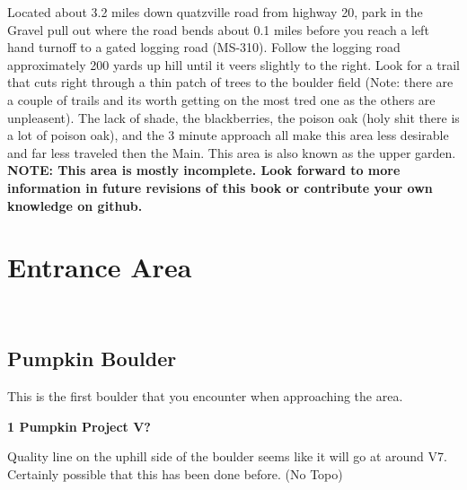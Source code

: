 \raggedcolumns
\begin{multicols}{2}
\begin{minipage}{\columnwidth}
Located about 3.2 miles down quatzville road from highway 20, park in the Gravel pull out where the road bends about 0.1 miles before you reach a left hand turnoff to a gated logging road (MS-310). Follow the logging road approximately 200 yards up hill until it veers slightly to the right. Look for a trail that cuts right through a thin patch of trees to the boulder field (Note: there are a couple of trails and its worth getting on the most tred one as the others are unpleasent). The lack of shade, the blackberries, the poison oak (holy shit there is a lot of poison oak), and the 3 minute approach all make this area less desirable and far less traveled then the Main. This area is also known as the upper garden.
\newline
\textbf{NOTE: This area is mostly incomplete. Look forward to more information in future revisions of this book or contribute your own knowledge on github.}
\end{minipage}

\newpage
		\section{Entrance Area}\label{sa:Entrance Area}
	\begin{minipage}{\columnwidth}
	\
	\end{minipage}
	
			\begin{minipage}{\columnwidth}
			\subsection*{Pumpkin Boulder}\label{bf:Pumpkin Boulder}
			This is the first boulder that you encounter when approaching the area.
			
			\end{minipage}
			
					\begin{minipage}{\linewidth}	
					\label{rt:Pumpkin Project}
\colorbox{black!20}{
\parbox{0.95\textwidth}{
\textbf{
1 Pumpkin Project V?  
}
}
}

					\begin{adjustwidth}{0.5cm}{}				
					Quality line on the uphill side of the boulder seems like it will go at around V7. Certainly possible that this has been done before.
						\newline (No Topo) 
					\end{adjustwidth}
					\end{minipage}
			\begin{minipage}{\columnwidth}

\end{minipage}
\end{multicols}
